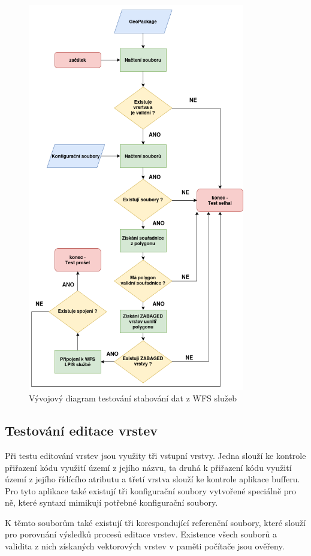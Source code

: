 \documentclass[a4paper,oneside,12pt]{book}
\begin{document}
\begin{figure}[H] \label{obr18}
\centering
\includegraphics[height=17cm]{pictures/test1.png}
\caption{Vývojový diagram testování stahování dat z WFS služeb}
\label{fig:test1}
\end{figure}

\subsection{Testování editace vrstev} \label{test_edit}
\hspace{10mm} Při testu editování vrstev jsou využity tři vstupní vrstvy. Jedna slouží ke kontrole přiřazení kódu využití území z jejího názvu, ta druhá k přiřazení kódu využití území z jejího řídícího atributu a třetí vrstva slouží ke kontrole aplikace bufferu. Pro tyto aplikace také existují tři konfigurační soubory vytvořené speciálně pro ně, které syntaxí mimikují potřebné konfigurační soubory.

\hspace{10mm} K těmto souborům také existují tři korespondující referenční soubory, které slouží pro porovnání výsledků procesů editace vrstev. Existence všech souborů a validita z nich získaných vektorových vrstev v paměti počítače jsou ověřeny.
\end{document}
